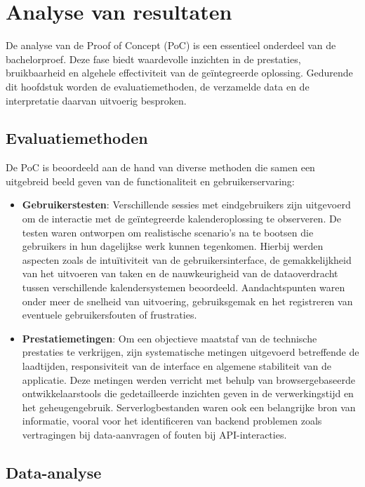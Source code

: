 \chapter{Analyse van resultaten}
\label{ch:analyse-testen}

De analyse van de Proof of Concept (PoC) is een essentieel onderdeel van de bachelorproef. Deze fase biedt waardevolle inzichten in de prestaties, bruikbaarheid en algehele effectiviteit van de geïntegreerde oplossing. Gedurende dit hoofdstuk worden de evaluatiemethoden, de verzamelde data en de interpretatie daarvan uitvoerig besproken.

\section{Evaluatiemethoden}

De PoC is beoordeeld aan de hand van diverse methoden die samen een uitgebreid beeld geven van de functionaliteit en gebruikerservaring:
\begin{itemize}
    \item \textbf{Gebruikerstesten}: Verschillende sessies met eindgebruikers zijn uitgevoerd om de interactie met de geïntegreerde kalenderoplossing te observeren. De testen waren ontworpen om realistische scenario's na te bootsen die gebruikers in hun dagelijkse werk kunnen tegenkomen. Hierbij werden aspecten zoals de intuïtiviteit van de gebruikersinterface, de gemakkelijkheid van het uitvoeren van taken en de nauwkeurigheid van de dataoverdracht tussen verschillende kalendersystemen beoordeeld. Aandachtspunten waren onder meer de snelheid van uitvoering, gebruiksgemak en het registreren van eventuele gebruikersfouten of frustraties.
    \item \textbf{Prestatiemetingen}: Om een objectieve maatstaf van de technische prestaties te verkrijgen, zijn systematische metingen uitgevoerd betreffende de laadtijden, responsiviteit van de interface en algemene stabiliteit van de applicatie. Deze metingen werden verricht met behulp van browsergebaseerde ontwikkelaarstools die gedetailleerde inzichten geven in de verwerkingstijd en het geheugengebruik. Serverlogbestanden waren ook een belangrijke bron van informatie, vooral voor het identificeren van backend problemen zoals vertragingen bij data-aanvragen of fouten bij API-interacties.
\end{itemize}

\section{Data-analyse}

